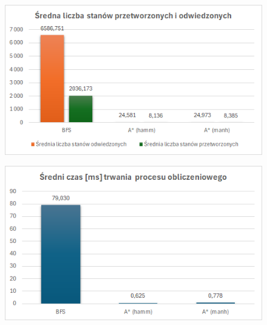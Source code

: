 \documentclass{classrep}
\begin{document}
\begin{figure}
    \centering
    \includegraphics[width=\textwidth,height=\textheight,keepaspectratio]{average-count-of-visited-without-dfs}
    \caption{}
    \label{fig:4}
\end{figure}
\begin{figure}
    \centering
    \includegraphics[width=\textwidth,height=\textheight,keepaspectratio]{average-time-without-dfs}
    \caption{}
    \label{fig:5}
\end{figure}
\end{document}
